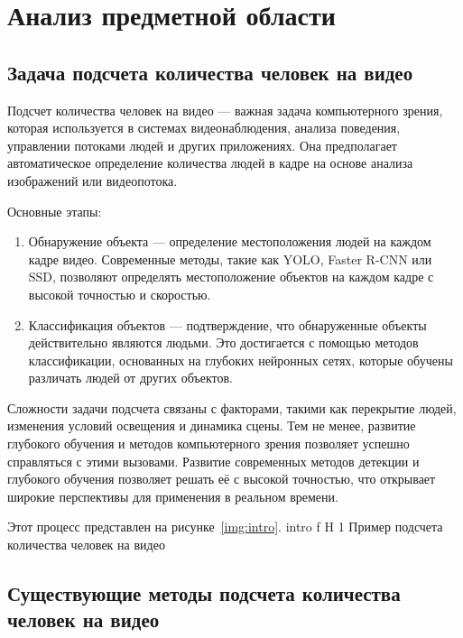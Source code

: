 \chapter{Анализ предметной области}

\section{Задача подсчета количества человек на видео}

Подсчет количества человек на видео --- важная задача компьютерного зрения, которая используется в системах видеонаблюдения, анализа поведения, управлении потоками людей и других приложениях.
Она предполагает автоматическое определение количества людей в кадре на основе анализа изображений или видеопотока.

Основные этапы:
\begin{enumerate}[leftmargin=1.6\parindent]
    \item Обнаружение объекта --- определение местоположения людей на каждом кадре видео.
    Современные методы, такие как YOLO, Faster R-CNN или SSD, позволяют определять местоположение объектов на каждом кадре с высокой точностью и скоростью.
    \item Классификация объектов --- подтверждение, что обнаруженные объекты действительно являются людьми. Это достигается с помощью методов классификации, основанных на глубоких нейронных сетях, которые обучены различать людей от других объектов.
\end{enumerate}

Сложности задачи подсчета связаны с факторами, такими как перекрытие людей, изменения условий освещения и динамика сцены.
Тем не менее, развитие глубокого обучения и методов компьютерного зрения позволяет успешно справляться с этими вызовами.
Развитие современных методов детекции и глубокого обучения позволяет решать её с высокой точностью, что открывает широкие перспективы для применения в реальном времени.

Этот процесс представлен на рисунке~\ref{img:intro}.
	{intro}
	{f}
	{H}
	{1\textwidth}
	{Пример подсчета количества человек на видео}

\section{Существующие методы подсчета количества человек на видео}

